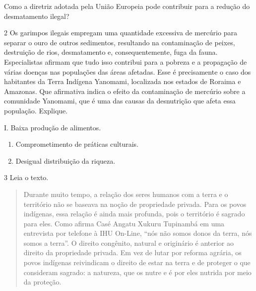 Como a diretriz adotada pela União Europeia pode contribuir para a
redução do desmatamento ilegal?


\num{2} Os garimpos ilegais empregam uma quantidade excessiva de
mercúrio para separar o ouro de outros sedimentos, resultando na
contaminação de peixes, destruição de rios, desmatamento e,
consequentemente, fuga da fauna. Especialistas afirmam que tudo isso
contribui para a pobreza e a propagação de várias doenças nas populações
das áreas afetadas. Esse é precisamente o caso dos habitantes da Terra
Indígena Yanomami, localizada nos estados de Roraima e Amazonas. Que
afirmativa indica o efeito da contaminação de mercúrio sobre a
comunidade Yanomami, que é uma das causas da desnutrição que afeta essa
população. Explique.

I. Baixa produção de alimentos.

\begin{enumerate}
\def\labelenumi{\Roman{enumi}.}
\setcounter{enumi}{1}
\item
  Comprometimento de práticas culturais.
\item
  Desigual distribuição da riqueza.
\end{enumerate}


\num{3} Leia o texto.

\begin{quote}
Durante muito tempo, a relação dos seres humanos com a terra e o
território não se baseava na noção de propriedade privada. Para os povos
indígenas, essa relação é ainda mais profunda, pois o território é
sagrado para eles. Como afirma Casé Angatu Xukuru Tupinambá em uma
entrevista por telefone à IHU On-Line, ``nós não somos donos da terra,
nós somos a terra''. O direito congênito, natural e originário é
anterior ao direito da propriedade privada. Em vez de lutar por reforma
agrária, os povos indígenas reivindicam o direito de estar na terra e de
proteger o que consideram sagrado: a natureza, que os nutre e é por eles
nutrida por meio da proteção.
\end{quote}

